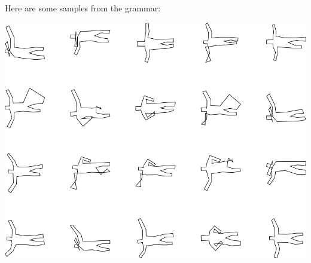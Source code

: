 Here are some samples from the grammar:

\includegraphics[width=6in]{output/3.learning/incremental/gram.26.d/samples.png}

